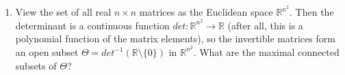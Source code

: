 \documentclass[11pt]{article}
\begin{document}
\begin{enumerate}
  \item
    View the set of all real \(n \times n\) matrices as the Euclidean space \(\mathbb{R}^{n^2}\).  Then the 
    determinant is a continuous function \(det \colon \mathbb{R}^{n^2} \to \mathbb{R}\) (after all, this is a 
    polynomial function of the matrix elements), so the invertible matrices form an open subset 
    \(\Theta = det^{-1}(\mathbb{R} \setminus \{0\})\) in \(\mathbb{R}^{n^2}\).  What are the maximal connected 
    subsets of \(\Theta\)?
  \newpage
\end{enumerate}
\end{document}
